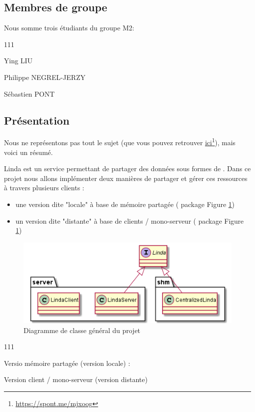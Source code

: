 \subsection{Membres de groupe}

Nous somme trois étudiants du groupe M2:
\begin{dinglist}{111}
    \item Ying LIU
    \item Philippe NEGREL-JERZY
    \item Sébastien PONT
\end{dinglist}

\subsection{Présentation}

Nous ne représentons pas tout le sujet (que vous pouvez retrouver \href{https://spont.me/mjxoog}{ici}\footnote{\href{https://spont.me/mjxoog}{https://spont.me/mjxoog}}), mais voici un résumé.

Linda est un service permettant de partager des données sous formes de .
Dans ce projet nous allons implémenter deux manières de partager et gérer ces ressources à travers plusieurs clients :

\begin{itemize}
    \item une version dite "locale" à base de mémoire partagée ( package Figure \ref{fig:main_class_diagram})
    \item un version dite "distante" à base de clients / mono-serveur ( package Figure \ref{fig:main_class_diagram})
\end{itemize}

\begin{figure}[H]
    \centering
    \includegraphics[scale=0.7]{src/part-01/mainCD.png}
    \caption{Diagramme de classe général du projet} \label{fig:main_class_diagram}
\end{figure}

\begin{dinglist}{111}
    \item Versio mémoire partagée (version locale) :
    \item
    \item Version client / mono-serveur (version distante)
\end{dinglist}